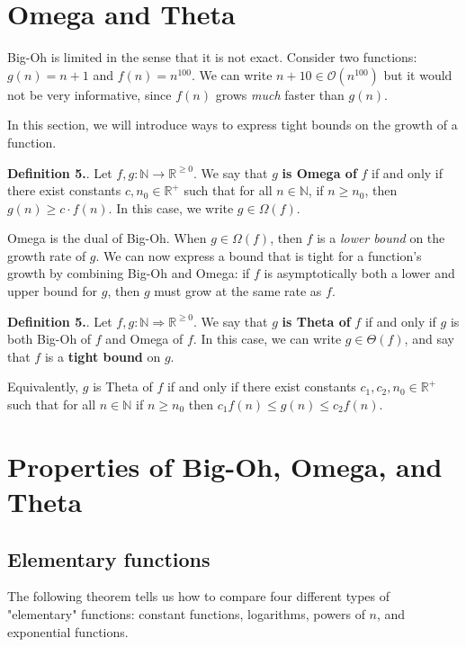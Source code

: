 \documentclass{article}
\newcounter{defcount}
\newcommand\df{\stepcounter{defcount} \textbf{Definition 5.\thedefcount}. }
\begin{document}
\section{Omega and Theta}
Big-Oh is limited in the sense that it is not exact. Consider two functions: 
$g (n) = n + 1$ and $f ( n) = n^{100}$. We can write $n + 10 \in \mathcal{O} (n^{100})$ 
but it would not be very informative, since $f(n)$ grows \textit{much }faster 
than $g(n)$.

In this section, we will introduce ways to express tight bounds on the growth 
of a function. 

\df Let $f, g : \mathbb{N} \rightarrow \mathbb{R}^{\geq 0 }$. We say that 
$g$ \textbf{is Omega of} $f$ if and only if there exist constants $c, n_0 
\in \mathbb{R}^+ $ such that for all $n \in \mathbb{N}$, if $n \geq n_0 $, 
then $g ( n) \geq c \cdot f ( n)$. In this case, we write $g \in \Omega (f)$.

Omega is the dual of Big-Oh. When $g \in \Omega (f)$, then $f$ is a \textit{lower 
bound} on the growth rate of $g$. We can now express a bound that is 
tight for a function's growth by combining Big-Oh and Omega: if $f $ is
asymptotically both a lower and upper bound for $g$, then $g$ must grow 
at the same rate as $f$.

\df Let $f, g : \mathbb{N} \Rightarrow \mathbb{R}^{\geq 0}. $ We say that 
$g$ \textbf{is Theta of} $f$ if and only if $g$ is both Big-Oh of $f$ 
and Omega of $f$. In this case, we can write $g \in \Theta (f)$, and say 
that $f$ is a \textbf{tight bound} on $g$.

Equivalently, $g$ is Theta of $f$ if and only if there exist constants 
$c_1, c_2, n_0 \in \mathbb{R}^+$ such that for all $n \in \mathbb{N}$ if 
$n \geq n_0 $ then $c_1 f (n) \leq g ( n) \leq c_2 f(n)$.

\section{Properties of Big-Oh, Omega, and Theta}
\subsection{Elementary functions}
The following theorem tells us how to compare four different types of 
"elementary" functions: constant functions, logarithms, powers of $n$, and 
exponential functions.
\end{document}
